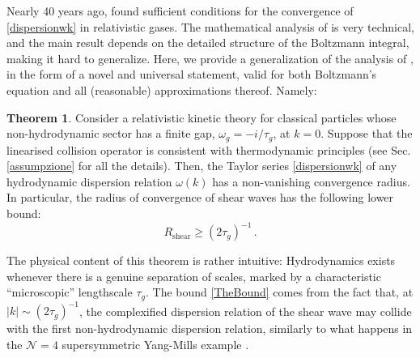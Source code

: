 \documentclass[a4paper, amsfonts, amssymb, amsmath, reprint, showkeys, nofootinbib, twoside, onecolumn,notitlepage]{revtex4-2}
\theoremstyle{definition}
\theoremstyle{theorem}
\newtheorem{theorem}{Theorem}
\theoremstyle{corollary}
\begin{document}
Nearly 40 years ago, \citet{Dudynski1989} found sufficient conditions for the convergence of \eqref{dispersionwk} in relativistic gases. The mathematical analysis of \cite{Dudynski1989} is very technical, and the main result depends on the detailed structure of the Boltzmann integral, making it hard to generalize. Here, we provide a generalization of the analysis of \cite{Dudynski1989}, in the form of a novel and universal statement, valid for both Boltzmann's equation and all (reasonable) approximations thereof. Namely:
\begin{theorem}\label{theo1}
Consider a relativistic kinetic theory for classical particles whose non-hydrodynamic sector has a finite gap, $\omega_g{=}-i/\tau_g$, at $k=0$. Suppose that the linearised collision operator is consistent with thermodynamic principles (see Sec. \ref{assumpzione} for all the details). Then, the Taylor series \eqref{dispersionwk} of any hydrodynamic dispersion relation $\omega(k)$ has a non-vanishing convergence radius. In particular, the radius of convergence of shear waves has the following lower bound:
\begin{equation}\label{TheBound}
 R_{\text{shear}} \geq (2\tau_g)^{-1} \, .   
\end{equation}
\end{theorem}
The physical content of this theorem is rather intuitive: Hydrodynamics exists whenever there is a genuine separation of scales, marked by a characteristic ``microscopic'' lengthscale $\tau_g$. The bound \eqref{TheBound} comes from the fact that, at $|k| \sim (2\tau_g)^{-1}$, the complexified dispersion relation of the shear wave may collide with the first non-hydrodynamic dispersion relation, similarly to what happens in the $\mathcal{N}{=}4$ supersymmetric Yang-Mills example \cite{GrozdanovGradient2019kge}. 
\end{document}
